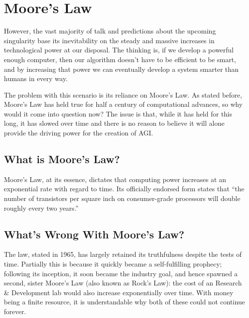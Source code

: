 \documentclass[12pt]{article} %
\begin{document}
\section{Moore's Law}

However, the vast majority of talk and predictions about the upcoming singularity base its inevitability on the steady and massive increases in technological power at our disposal\cite{wbw2}. The thinking is, if we develop a powerful enough computer, then our algorithm doesn't have to be efficient to be smart, and by increasing that power we can eventually develop a system smarter than humans in every way.

The problem with this scenario is its reliance on Moore's Law. As stated before, Moore's Law has held true for half a century of computational advances, so why would it come into question now? The issue is that, while it has held for this long, it has slowed over time and there is no reason to believe it will alone provide the driving power for the creation of AGI.


\subsection{What is Moore's Law?} %

Moore's Law, at its essence, dictates that computing power increases at an exponential rate with regard to time. Its officially endorsed form states that ``the number of transistors per square inch on consumer-grade processors will double roughly every two years.''\cite{wikimooreslaw}


\subsection{What's Wrong With Moore's Law?} %

The law, stated in 1965, has largely retained its truthfulness despite the tests of time. Partially this is because it quickly became a self-fulfilling prophecy; following its inception, it soon became the industry goal, and hence spawned a second, sister Moore's Law (also known as Rock's Law): the cost of an Research \& Development lab would also increase exponentially over time. With money being a finite resource, it is understandable why both of these could not continue forever\cite{memristor}.
\end{document}
